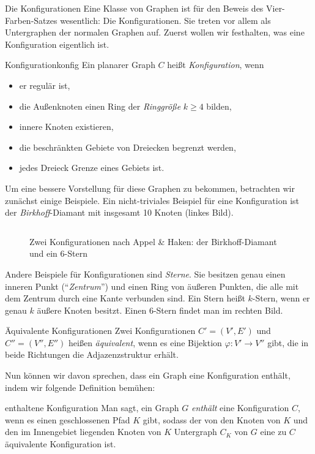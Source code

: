   \begin{section}{Die Konfigurationen}
   Eine Klasse von Graphen ist für den Beweis des Vier-Farben-Satzes wesentlich: Die Konfigurationen. Sie treten vor allem als Untergraphen der normalen Graphen auf. Zuerst wollen wir festhalten, was eine Konfiguration eigentlich ist.
   
   \begin{definitionl}{Konfiguration}{konfig}
    Ein planarer Graph $C$ heißt \textit{Konfiguration}, wenn
    \begin{itemize}
     \item er regulär ist,
     \item die Außenknoten einen Ring der \textit{Ringgröße} $k \geq 4$ bilden,
     \item innere Knoten existieren,
     \item die beschränkten Gebiete von Dreiecken begrenzt werden,
     \item jedes Dreieck Grenze eines Gebiets ist.
    \end{itemize}
   \end{definitionl}
   
  Um eine bessere Vorstellung für diese Graphen zu bekommen, betrachten wir zunächst einige Beispiele. Ein nicht-triviales Beispiel für eine Konfiguration ist der \textit{Birkhoff}-Diamant mit insgesamt 10 Knoten (linkes Bild).
   
  \begin{figure}[hb]
   \label{AHkonfig}
    \[     \]
    \caption[Zwei Konfigurationen nach Appel \& Haken: der Birkhoff-Diamant und ein $6$-Stern]{Zwei Konfigurationen nach Appel \& Haken: der Birkhoff-Diamant und ein $6$-Stern}
  \end{figure}
 
   
  Andere Beispiele für Konfigurationen sind \textit{Sterne}. Sie besitzen genau einen inneren Punkt (``\textit{Zentrum}'') und einen Ring von äußeren Punkten, die alle mit dem Zentrum durch eine Kante verbunden sind. Ein Stern heißt $k$-Stern, wenn er genau $k$ äußere Knoten besitzt. Einen $6$-Stern findet man im rechten Bild.
  
  \begin{definition}{Äquivalente Konfigurationen}
   Zwei Konfigurationen $C'=(V',E')$ und $C''=(V'',E'')$ heißen \textit{äquivalent}, wenn es eine Bijektion $\varphi : V' \rightarrow V''$ gibt, die in beide Richtungen die Adjazenzstruktur erhält.
  \end{definition}
  
  Nun können wir davon sprechen, dass ein Graph eine Konfiguration enthält, indem wir folgende Definition bemühen:
  
  \begin{definition}{enthaltene Konfiguration}
   Man sagt, ein Graph $G$ \textit{enthält} eine Konfiguration $C$, wenn es einen geschlossenen Pfad $K$ gibt, sodass der von den Knoten von $K$ und den im Innengebiet liegenden Knoten von $K$ Untergraph $C_K$ von $G$ eine zu $C$ äquivalente Konfiguration ist.
  \end{definition}


  \end{section}
\newpage